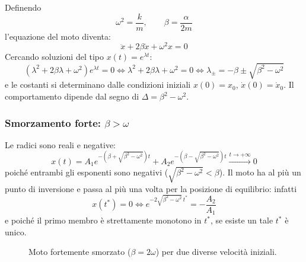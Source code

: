 \documentclass[11pt, a4paper, openright]{book}
\theoremstyle{plain}
\theoremstyle{definition}
\theoremstyle{remark}
\begin{document}
Definendo
\begin{equation}
    \omega^2 = \frac{k}{m}, \qquad \beta = \frac{\alpha}{2m}
\end{equation}
l'equazione del moto diventa:
\begin{equation}
    \ddot{x} + 2\beta\dot{x} + \omega^2 x = 0
\end{equation}
Cercando soluzioni del tipo $x(t) = e^{\lambda t}$:
\begin{equation}
    \left(\lambda^2 + 2\beta\lambda + \omega^2\right)e^{\lambda t} = 0 \iff \lambda^2 + 2\beta\lambda + \omega^2 = 0 \iff \lambda_\pm = -\beta \pm \sqrt{\beta^2 - \omega^2}
\end{equation}
e le costanti si determinano dalle condizioni iniziali $x(0) = x_0$, $\dot{x}(0) = \dot{x}_0$. Il comportamento dipende dal segno di $\Delta = \beta^2 - \omega^2$.

\subsubsection{Smorzamento forte: $\beta > \omega$}
Le radici sono reali e negative:
\begin{equation}
    x(t) = A_1 e^{-\left(\beta + \sqrt{\beta^2 - \omega^2}\right)t} + A_2 e^{-\left(\beta - \sqrt{\beta^2 - \omega^2}\right)t} \xrightarrow{t \to +\infty} 0
\end{equation}
poiché entrambi gli esponenti sono negativi ($\sqrt{\beta^2 - \omega^2} < \beta$). Il moto ha al più un punto di inversione e passa al più una volta per la posizione di equilibrio: infatti
\begin{equation}
    x(t^*) = 0 \iff e^{-2\sqrt{\beta^2 - \omega^2}\,t^*} = -\frac{A_2}{A_1}
\end{equation}
e poiché il primo membro è strettamente monotono in $t^*$, se esiste un tale $t^*$ è unico.

\begin{figure}[H]
    \centering
    \caption{Moto fortemente smorzato ($\beta = 2\omega$) per due diverse velocità iniziali.}
\end{figure}
\end{document}
